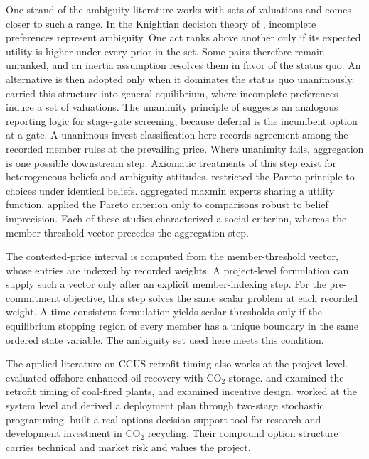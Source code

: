 \documentclass[5p,times,authoryear]{elsarticle}
\theoremstyle{plain}
\begin{document}
One strand of the ambiguity literature works with sets of valuations and comes closer to such a range. In the Knightian decision theory of \citet{Bewley2002}, incomplete preferences represent ambiguity. One act ranks above another only if its expected utility is higher under every prior in the set. Some pairs therefore remain unranked, and an inertia assumption resolves them in favor of the status quo. An alternative is then adopted only when it dominates the status quo unanimously. \citet{RigottiShannon2005} carried this structure into general equilibrium, where incomplete preferences induce a set of valuations. The unanimity principle of \citet{Bewley2002} suggests an analogous reporting logic for stage-gate screening, because deferral is the incumbent option at a gate. A unanimous invest classification here records agreement among the recorded member rules at the prevailing price. Where unanimity fails, aggregation is one possible downstream step. Axiomatic treatments of this step exist for heterogeneous beliefs and ambiguity attitudes. \citet{Gilboa2004} restricted the Pareto principle to choices under identical beliefs. \citet{Cres2011} aggregated maxmin experts sharing a utility function. \citet{Danan2016} applied the Pareto criterion only to comparisons robust to belief imprecision. Each of these studies characterized a social criterion, whereas the member-threshold vector precedes the aggregation step.

The contested-price interval is computed from the member-threshold vector, whose entries are indexed by recorded weights. A project-level formulation can supply such a vector only after an explicit member-indexing step. For the pre-commitment objective, this step solves the same scalar problem at each recorded weight. A time-consistent formulation yields scalar thresholds only if the equilibrium stopping region of every member has a unique boundary in the same ordered state variable. The ambiguity set used here meets this condition.

The applied literature on CCUS retrofit timing also works at the project level. \citet{Compernolle2017} evaluated offshore enhanced oil recovery with CO$_2$ storage. \citet{Fan2023} and \citet{Li2026} examined the retrofit timing of coal-fired plants, and \citet{Sun2024} examined incentive design. \citet{Colombe2024} worked at the system level and derived a deployment plan through two-stage stochastic programming. \citet{Deeney2021} built a real-options decision support tool for research and development investment in CO$_2$ recycling. Their compound option structure carries technical and market risk and values the project.
\end{document}

